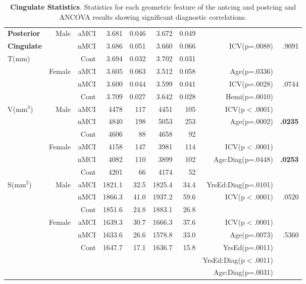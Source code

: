 \documentclass[12pt]{article}
\newcommand\T{\rule{0pt}{2.6ex}}
\begin{document}
\begin{table}[p]
\begin{tabular}{l|rr|rrrr|rr}
	\hline\hline
	\textbf{Posterior}  & \multirow{3}{*}{Male} & aMCI\T & 3.681 & 0.046 &3.672 & 0.049 & & \\
	\textbf{Cingulate}						&						& nMCI & 3.686 & 0.051 & 3.660 & 0.066 & ICV(p=.0088) & .9091 \\
		\multirow{2}{*}{T(mm)}					&						& Cont & 3.694 & 0.032 & 3.702 & 0.031 & & \\	\cline{2-9} 				
							&	\multirow{3}{*}{Female}	& aMCI\T & 3.605 & 0.063 & 3.512 & 0.058 & Age(p=.0336) &  \\
							&						& nMCI & 3.600 & 0.044 & 3.599 & 0.041 & ICV(p=.0028)& .0744\\
							&						& Cont & 3.709 & 0.027 & 3.642 & 0.028 & Hemi(p=.0010) & \\
	\hline
	\multirow{6}{*}{V(mm$^3$)} & \multirow{3}{*}{Male} & aMCI\T & 4478 & 117 & 4451 & 105 & ICV(p$<$.0001) &  \\
							&						& nMCI & 4840 & 198 & 5053 & 253 & Age(p=.0002) & \textbf{.0235} \\
							&						& Cont & 4606 & 88 & 4658 & 92 &  & \\ \cline{2-9}
							&	\multirow{3}{*}{Female}	& aMCI\T & 4158 & 147 & 3981 & 114 & ICV(p$<$.0001) & \\
							&						& nMCI & 4082 & 110 & 3899 & 102 & Age:Diag(p=.0448) & \textbf{.0253} \\
							&						& Cont & 4201 & 66 & 4174 & 52 & & \\
	\hline
	\multirow{6}{*}{S(mm$^2$)} & \multirow{3}{*}{Male} & aMCI\T & 1821.1 & 32.5 & 1825.4 & 34.4 & YrsEd:Diag(p=.0101) & \\
							&						& nMCI & 1866.3 & 41.0 & 1937.2 & 59.6 & ICV(p$<$.0001) & .0520 \\
							&						& Cont & 1851.6 & 24.8 & 1883.1 & 26.8 &  & \\\cline{2-9}
							&	\multirow{3}{*}{Female}	& aMCI\T & 1639.3 & 30.7 & 1666.3 & 37.6 & ICV(p$<$.0001) & \\
							&						& nMCI & 1633.6 & 26.6 & 1578.8 & 33.0 & Age(p=.0073) & .5360\\
							&						& Cont & 1647.7 & 17.1 & 1636.7 & 15.8 &  YrsEd(p=.0011)& \\
							&						& & & & & & YrsEd:Diag(p$<$.0011) & \\
							&						& & & & & & Age:Diag(p=.0031) & \\								
	\end{tabular}
	\caption{\textbf{Cingulate Statistics}.  Statistics for each geometric feature of the antcing and postcing and ANCOVA results showing significant diagnostic correlations.}
	\label{Wave1.cing.ANCOVA}
\end{table}
\end{document}
